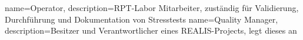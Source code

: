 {
    name=Operator,
    description={RPT-Labor Mitarbeiter, zuständig für Validierung, Durchführung und Dokumentation von Stresstests}
}
{
    name=Quality Manager,
    description={Besitzer und Verantwortlicher eines REALIS-Projects, legt dieses an}
}
